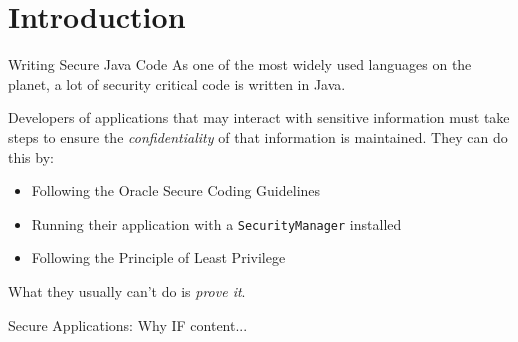\section{Introduction}

\begin{frame}{Writing Secure Java Code}
	As one of the most widely used languages on the planet, a lot of security critical code is written in Java.
	
	Developers of applications that may interact with sensitive information must take steps to ensure the \textit{confidentiality} of that information is maintained. They can do this by:
	
	\begin{itemize}
		\item Following the Oracle Secure Coding Guidelines
		\item Running their application with a \texttt{SecurityManager} installed
		\item Following the Principle of Least Privilege
	\end{itemize}
	
	What they usually can't do is \textit{prove it}.
\end{frame}

\begin{frame}{Secure Applications: Why IF}
	content...
\end{frame}



